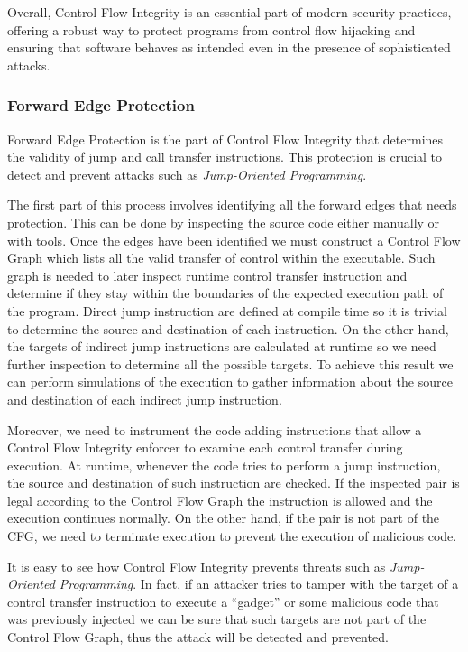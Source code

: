 Overall, Control Flow Integrity is an essential part of modern security
practices, offering a robust way to protect programs from control flow hijacking
and ensuring that software behaves as intended even in the presence of sophisticated
attacks.

\subsubsection{Forward Edge Protection}
\label{subsubsec:background_forward}

Forward Edge Protection is the part of Control Flow Integrity that determines
the validity of jump and call transfer instructions. This protection is crucial to
detect and prevent attacks such as \textit{Jump-Oriented Programming}.

The first part of this process involves identifying all the forward edges that
needs protection. This can be done by inspecting the source code either manually
or with tools. Once the edges have been identified we must construct a Control
Flow Graph which lists all the valid transfer of control within the executable. Such
graph is needed to later inspect runtime control transfer instruction and determine
if they stay within the boundaries of the expected execution path of the program.
Direct jump instruction are defined at compile time so it is trivial to
determine the source and destination of each instruction. On the other hand, the
targets of indirect jump instructions are calculated at runtime so we need
further inspection to determine all the possible targets. To achieve this result
we can perform simulations of the execution to gather information about the source
and destination of each indirect jump instruction.

Moreover, we need to instrument the code adding instructions that allow a
Control Flow Integrity enforcer to examine each control transfer during
execution. At runtime, whenever the code tries to perform a jump instruction, the
source and destination of such instruction are checked. If the inspected pair is
legal according to the Control Flow Graph the instruction is allowed and the
execution continues normally. On the other hand, if the pair is not part of the
CFG, we need to terminate execution to prevent the execution of malicious code.

It is easy to see how Control Flow Integrity prevents threats such as \textit{Jump-Oriented
Programming}. In fact, if an attacker tries to tamper with the target of a
control transfer instruction to execute a ``gadget'' or some malicious code that
was previously injected we can be sure that such targets are not part of the
Control Flow Graph, thus the attack will be detected and prevented.

